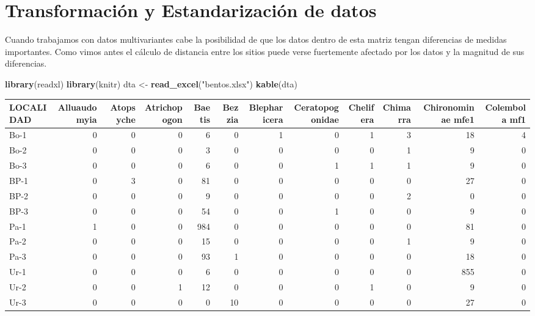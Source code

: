 \documentclass[]{book}
\newenvironment{Shaded}{\begin{snugshade}}{\end{snugshade}}
\newcommand{\KeywordTok}[1]{\textcolor[rgb]{0.13,0.29,0.53}{\textbf{{#1}}}}
\newcommand{\StringTok}[1]{\textcolor[rgb]{0.31,0.60,0.02}{{#1}}}
\newcommand{\NormalTok}[1]{{#1}}
\begin{document}
\section{Transformación y Estandarización de
datos}\label{transformacion-y-estandarizacion-de-datos-1}

Cuando trabajamos con datos multivariantes cabe la posibilidad de que
los datos dentro de esta matriz tengan diferencias de medidas
importantes. Como vimos antes el cálculo de distancia entre los sitios
puede verse fuertemente afectado por los datos y la magnitud de sus
diferencias.

\begin{Shaded}
\begin{Highlighting}[]
\KeywordTok{library}\NormalTok{(readxl)}
\KeywordTok{library}\NormalTok{(knitr)}
\NormalTok{dta <-}\StringTok{ }\KeywordTok{read_excel}\NormalTok{(}\StringTok{"bentos.xlsx"}\NormalTok{)}
\KeywordTok{kable}\NormalTok{(dta)}
\end{Highlighting}
\end{Shaded}

\begin{tabular}{l|r|r|r|r|r|r|r|r|r|r|r}
\hline
LOCALIDAD & Alluaudomyia & Atopsyche & Atrichopogon & Baetis & Bezzia & Blepharicera & Ceratopogonidae & Chelifera & Chimarra & Chironominae mfe1 & Colembola mf1\\
\hline
Bo-1 & 0 & 0 & 0 & 6 & 0 & 1 & 0 & 1 & 3 & 18 & 4\\
\hline
Bo-2 & 0 & 0 & 0 & 3 & 0 & 0 & 0 & 0 & 1 & 9 & 0\\
\hline
Bo-3 & 0 & 0 & 0 & 6 & 0 & 0 & 1 & 1 & 1 & 9 & 0\\
\hline
BP-1 & 0 & 3 & 0 & 81 & 0 & 0 & 0 & 0 & 0 & 27 & 0\\
\hline
BP-2 & 0 & 0 & 0 & 9 & 0 & 0 & 0 & 0 & 2 & 0 & 0\\
\hline
BP-3 & 0 & 0 & 0 & 54 & 0 & 0 & 1 & 0 & 0 & 9 & 0\\
\hline
Pa-1 & 1 & 0 & 0 & 984 & 0 & 0 & 0 & 0 & 0 & 81 & 0\\
\hline
Pa-2 & 0 & 0 & 0 & 15 & 0 & 0 & 0 & 0 & 1 & 9 & 0\\
\hline
Pa-3 & 0 & 0 & 0 & 93 & 1 & 0 & 0 & 0 & 0 & 18 & 0\\
\hline
Ur-1 & 0 & 0 & 0 & 6 & 0 & 0 & 0 & 0 & 0 & 855 & 0\\
\hline
Ur-2 & 0 & 0 & 1 & 12 & 0 & 0 & 0 & 1 & 0 & 9 & 0\\
\hline
Ur-3 & 0 & 0 & 0 & 0 & 10 & 0 & 0 & 0 & 0 & 27 & 0\\
\hline
\end{tabular}
\end{document}
